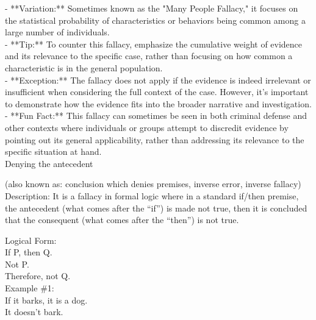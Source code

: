 \documentclass[a4paper,12pt,single,pdftex]{scrartcl}
\begin{document}
    
      - **Variation:** Sometimes known as the "Many People Fallacy," it focuses on the statistical probability of characteristics or behaviors being common among a large number of individuals.
    \\

    
      - **Tip:** To counter this fallacy, emphasize the cumulative weight of evidence and its relevance to the specific case, rather than focusing on how common a characteristic is in the general population.
    \\

    
      - **Exception:** The fallacy does not apply if the evidence is indeed irrelevant or insufficient when considering the full context of the case. However, it’s important to demonstrate how the evidence fits into the broader narrative and investigation.
    \\

    
      - **Fun Fact:** This fallacy can sometimes be seen in both criminal defense and other contexts where individuals or groups attempt to discredit evidence by pointing out its general applicability, rather than addressing its relevance to the specific situation at hand.
    \\

  

Denying the antecedent
    
      (also known as: conclusion which denies premises, inverse error, inverse fallacy)
    \\

  
    Description: It is a fallacy in formal logic where in a standard if/then premise, the antecedent (what comes after the “if”) is made not true, then it is concluded that the consequent (what comes after the “then”) is not true.

    
      Logical Form:
    \\

    
      If P, then Q.
    \\

    
      Not P.
    \\

    
      Therefore, not Q.
    \\

    
      Example \#1:
    \\

    
      If it barks, it is a dog.
    \\

    
      It doesn’t bark.
    \\
\end{document}

